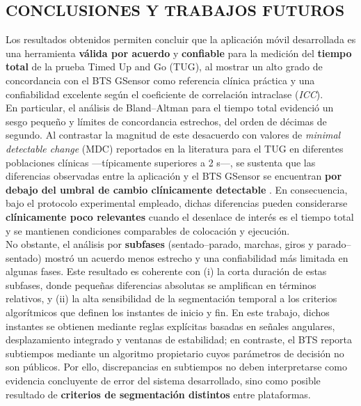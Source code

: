 \documentclass[12pt]{report}
\begin{document}
\begin{justify}
    \chapter{CONCLUSIONES Y TRABAJOS FUTUROS}
    \label{ch:conclusiones-futuros}

    Los resultados obtenidos permiten concluir que la aplicación móvil desarrollada es una herramienta \textbf{válida por acuerdo} y \textbf{confiable} para la medición del \textbf{tiempo total} de la prueba Timed Up and Go (TUG), al mostrar un alto grado de concordancia con el BTS GSensor como referencia clínica práctica y una confiabilidad excelente según el coeficiente de correlación intraclase (\textit{ICC}).\\

    En particular, el análisis de Bland--Altman para el tiempo total evidenció un sesgo pequeño y límites de concordancia estrechos, del orden de décimas de segundo. Al contrastar la magnitud de este desacuerdo con valores de \textit{minimal detectable change} (MDC) reportados en la literatura para el TUG en diferentes poblaciones clínicas —típicamente superiores a 2 s—, se sustenta que las diferencias observadas entre la aplicación y el BTS GSensor se encuentran \textbf{por debajo del umbral de cambio clínicamente detectable} \cite{Steffen2008_MDC_TUG_parkinsonism,Huang2011_MDC_TUG_PD,Ries2009_MDC_TUG_Alzheimer}. En consecuencia, bajo el protocolo experimental empleado, dichas diferencias pueden considerarse \textbf{clínicamente poco relevantes} cuando el desenlace de interés es el tiempo total y se mantienen condiciones comparables de colocación y ejecución.\\

    No obstante, el análisis por \textbf{subfases} (sentado--parado, marchas, giros y parado--sentado) mostró un acuerdo menos estrecho y una confiabilidad más limitada en algunas fases. Este resultado es coherente con (i) la corta duración de estas subfases, donde pequeñas diferencias absolutas se amplifican en términos relativos, y (ii) la alta sensibilidad de la segmentación temporal a los criterios algorítmicos que definen los instantes de inicio y fin. En este trabajo, dichos instantes se obtienen mediante reglas explícitas basadas en señales angulares, desplazamiento integrado y ventanas de estabilidad; en contraste, el BTS reporta subtiempos mediante un algoritmo propietario cuyos parámetros de decisión no son públicos. Por ello, discrepancias en subtiempos no deben interpretarse como evidencia concluyente de error del sistema desarrollado, sino como posible resultado de \textbf{criterios de segmentación distintos} entre plataformas.\\


\end{justify}
\end{document}
